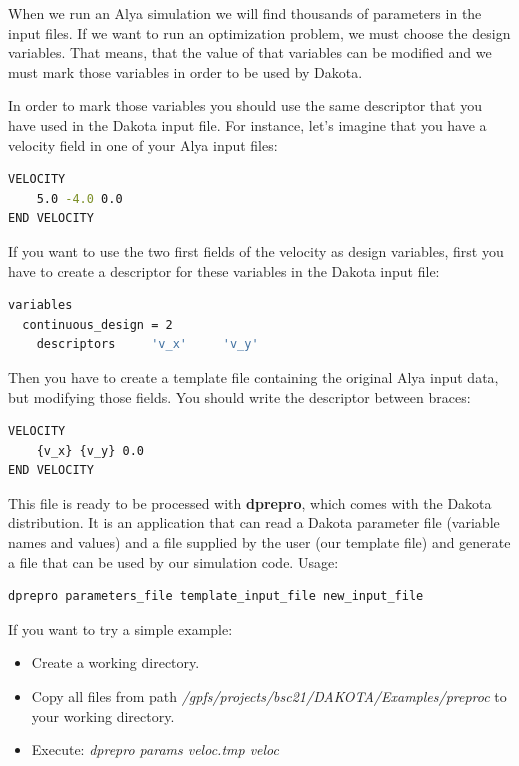 \documentclass[12pt,a4paper,article]{memoir}
\begin{document}
When we run an Alya simulation we will find thousands of parameters in the input files. If we want to run an optimization problem, we must choose the design variables. That means, that the value of that variables can be modified and we must mark those variables in order to be used by Dakota.

In order to mark those variables you should use the same descriptor that you have used in the Dakota input file. For instance, let's imagine that you have a velocity field in one of your Alya input files:

\begin{lstlisting}[style=MyCodeStyle,language=bash]
VELOCITY
	5.0 -4.0 0.0
END VELOCITY  
\end{lstlisting}

If you want to use the two first fields of the velocity as design variables, first you have to create a descriptor for these variables in the Dakota input file:

\begin{lstlisting}[style=MyCodeStyle,language=bash]
variables
  continuous_design = 2
    descriptors     'v_x'     'v_y'
\end{lstlisting}

Then you have to create a template file containing the original Alya input data, but modifying those fields. You should write the descriptor between braces:

\begin{lstlisting}[style=MyCodeStyle,language=bash]
VELOCITY
	{v_x} {v_y} 0.0
END VELOCITY
\end{lstlisting}

This file is ready to be processed with \textbf{dprepro}, which comes with the Dakota distribution. It is an application that can read a Dakota parameter file (variable names and values) and a file supplied by the user (our template file) and generate a file that can be used by our simulation code. Usage:

\begin{lstlisting}[style=MyCodeStyle,language=bash]
dprepro parameters_file template_input_file new_input_file
\end{lstlisting}

If you want to try a simple example:
\begin{itemize}
\item Create a working directory.
\item Copy all files from path \textit{/gpfs/projects/bsc21/DAKOTA/Examples/preproc} to your working directory.
\item Execute: \textit{dprepro params veloc.tmp veloc}
\end{itemize}
\end{document}
